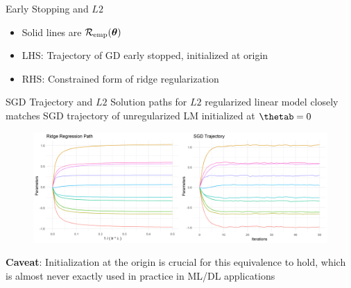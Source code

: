 \documentclass[11pt,compress,t,notes=noshow, xcolor=table]{beamer}
\begin{document}
\begin{vbframe}{Early Stopping and $L2$ }
\begin{itemize}
\item Solid lines are $\mathcal{R}_{\text{emp}}(\bm{\theta})$ 
\item LHS: Trajectory of GD early stopped, initialized at origin
\item RHS: Constrained form of ridge regularization
\end{itemize}

\end{vbframe}

\begin{vbframe}{SGD Trajectory and $L2$ }
Solution paths for $L2$ regularized linear model closely matches SGD trajectory of unregularized LM initialized at $\thetab=0$ 
\lz
  \begin{figure}
    \centering
      {\includegraphics{figure/ridge_vs_sgd_path.png}}
  \end{figure}

\textbf{Caveat}: Initialization at the origin is crucial for this equivalence to hold, which is almost never exactly used in practice in ML/DL applications

\end{vbframe}

\endlecture
\end{document}
